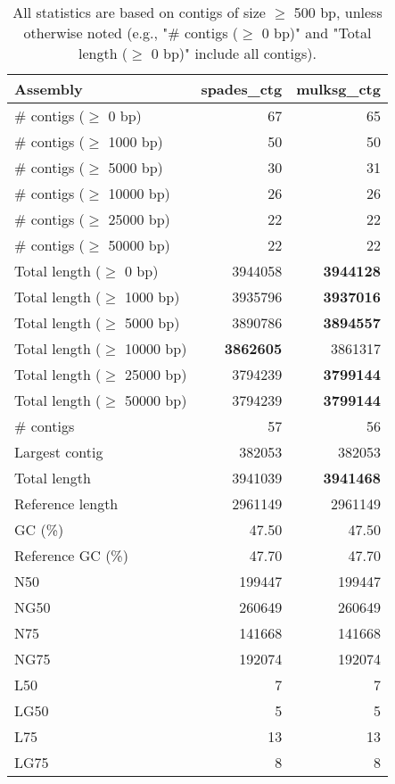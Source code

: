 \documentclass[12pt,a4paper]{article}
\begin{document}
\begin{table}[ht]
\begin{center}
\caption{All statistics are based on contigs of size $\geq$ 500 bp, unless otherwise noted (e.g., "\# contigs ($\geq$ 0 bp)" and "Total length ($\geq$ 0 bp)" include all contigs).}
\begin{tabular}{|l*{2}{|r}|}
\hline
Assembly & spades\_ctg & mulksg\_ctg \\ \hline
\# contigs ($\geq$ 0 bp) & 67 & 65 \\ \hline
\# contigs ($\geq$ 1000 bp) & 50 & 50 \\ \hline
\# contigs ($\geq$ 5000 bp) & 30 & 31 \\ \hline
\# contigs ($\geq$ 10000 bp) & 26 & 26 \\ \hline
\# contigs ($\geq$ 25000 bp) & 22 & 22 \\ \hline
\# contigs ($\geq$ 50000 bp) & 22 & 22 \\ \hline
Total length ($\geq$ 0 bp) & 3944058 & {\bf 3944128} \\ \hline
Total length ($\geq$ 1000 bp) & 3935796 & {\bf 3937016} \\ \hline
Total length ($\geq$ 5000 bp) & 3890786 & {\bf 3894557} \\ \hline
Total length ($\geq$ 10000 bp) & {\bf 3862605} & 3861317 \\ \hline
Total length ($\geq$ 25000 bp) & 3794239 & {\bf 3799144} \\ \hline
Total length ($\geq$ 50000 bp) & 3794239 & {\bf 3799144} \\ \hline
\# contigs & 57 & 56 \\ \hline
Largest contig & 382053 & 382053 \\ \hline
Total length & 3941039 & {\bf 3941468} \\ \hline
Reference length & 2961149 & 2961149 \\ \hline
GC (\%) & 47.50 & 47.50 \\ \hline
Reference GC (\%) & 47.70 & 47.70 \\ \hline
N50 & 199447 & 199447 \\ \hline
NG50 & 260649 & 260649 \\ \hline
N75 & 141668 & 141668 \\ \hline
NG75 & 192074 & 192074 \\ \hline
L50 & 7 & 7 \\ \hline
LG50 & 5 & 5 \\ \hline
L75 & 13 & 13 \\ \hline
LG75 & 8 & 8 \\ \hline

\end{tabular}
\end{center}
\end{table}
\end{document}
